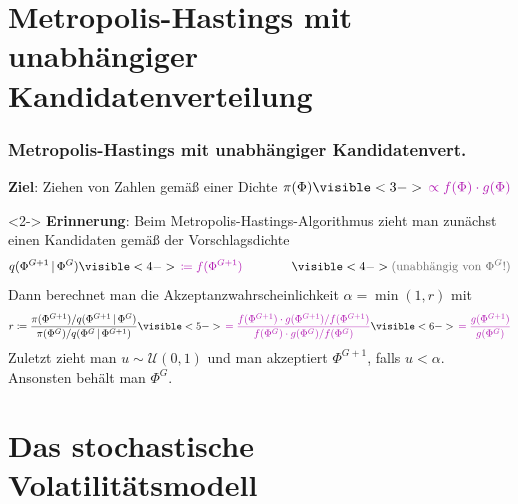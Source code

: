 \documentclass[10pt]{beamer}
\theoremstyle{definition}
\newcommand{\Uniform}{\mathcal{U}} %
\newcommand{\typeInfo}[1]{\textcolor{TypeInfoColor}{#1}}
\newcommand{\variant}[1]{\textcolor{VariantColor}{#1}}
\begin{document}

\section[Unabhängiger Metropolis-Hastings-Algorithmus]{Metropolis-Hastings mit unabhängiger Kandidatenverteilung}

\begin{frame}
  \frametitle{Metropolis-Hastings mit unabhängiger Kandidatenvert.}

  \textbf{Ziel}: Ziehen von Zahlen gemäß einer Dichte
  $
    \pi(\Phi)
    \visible<3->{\variant{\,\propto f(\Phi) \cdot g(\Phi)}}
  $

  \visible<3->{\variant{(wobei $f$ eine wohlbekannte Wahrscheinlichkeitsdichte ist)}}

  \vspace{10pt}

  \begin{visibleenv}<2->
    \textbf{Erinnerung}: Beim Metropolis-Hastings-Algorithmus zieht man zunächst einen Kandidaten gemäß der Vorschlagsdichte
    \[
      q(\Phi^{G+1} \,|\, \Phi^G)
      \visible<4->{\,\variant{\coloneqq f(\Phi^{G+1})}}
      \qquad\qquad
      \visible<4->{\typeInfo{\text{(unabhängig von $\Phi^G$!)}}}
    \]
    Dann berechnet man die Akzeptanzwahrscheinlichkeit $\alpha = \min(1, r)$ mit
    \[
      r \coloneqq \frac{\pi(\Phi^{G+1}) / q(\Phi^{G+1} \,|\, \Phi^G)}{\pi(\Phi^G) / q(\Phi^G \,|\, \Phi^{G+1})}
      \visible<5->{\variant{\, = \frac{f(\Phi^{G+1}) \cdot g(\Phi^{G+1}) / f(\Phi^{G+1})}{f(\Phi^{G}) \cdot g(\Phi^{G}) / f(\Phi^{G})}}}
      \visible<6->{\variant{\, = \frac{g(\Phi^{G+1})}{g(\Phi^G)}}}
    \]
    Zuletzt zieht man $u \sim \Uniform(0, 1)$ und man akzeptiert $\Phi^{G+1}$, falls $u < \alpha$. Ansonsten behält man $\Phi^G$.
  \end{visibleenv}
\end{frame}


\section[Stoch. Volatilitätsmodell]{Das stochastische Volatilitätsmodell}
\end{document}
